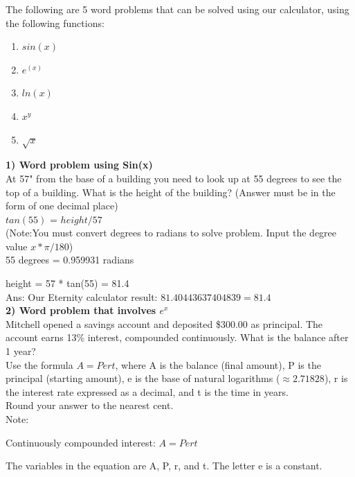 \documentclass[a4paper, 12pt]{article}
\begin{document}
The following are 5 word problems that can be solved using our calculator, using the following functions: 
\\

\begin{enumerate}
	\item $sin(x)$
	\item $e^(x)$
	\item $ln(x)$ 
	\item $x^y$ 
	\item $\sqrt{x}$
\end{enumerate}


\textbf{1) Word problem using Sin(x)}
\\

At 57" from the base of a building you need to look up at 55 degrees to see the top of a building. What is the height of the building? (Answer must be in the form of one decimal place)
\\

$tan(55)$ = $height/57$ 
\\

(Note:You must convert degrees to radians to solve problem. Input the degree value $x * \pi / 180$)
\\

55 degrees = 0.959931 radians

height = 57 * tan(55) = 81.4
\\

Ans: Our Eternity calculator result: $81.40443637404839 = 81.4$
\\

\textbf{2) Word problem that involves $e^x$ }
\\

Mitchell opened a savings account and deposited \$300.00 as principal. The account earns 13\% interest, compounded continuously. What is the balance after 1 year?
\\

Use the formula $A = Pert$, where A is the balance (final amount), P is the principal (starting amount), e is the base of natural logarithms ($\approx2.71828$), r is the interest rate expressed as a decimal, and t is the time in years.
\\

Round your answer to the nearest cent.
\\

Note:

Continuously compounded interest:
$A=Pert$

The variables in the equation are A, P, r, and t. The letter e is a constant.\\
\end{document}
